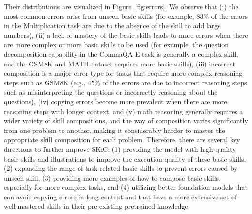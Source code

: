Their distributions are visualized in Figure~\ref{fig:errors}. We observe that (i) the most common errors arise from unseen basic skills (for example, 83\% of the errors in the Multiplication task are due to the absence of the skill to add large numbers), (ii) a lack of mastery of the basic skills leads to more errors when there are more complex or more basic skills to be used (for example, the question decomposition capability in the CommaQA-E task is generally a complex skill, and the GSM8K and MATH dataset requires more basic skills), (iii) incorrect composition is a major error type for tasks that require more complex reasoning steps such as GSM8K (e.g., 45\% of the errors are due to incorrect reasoning steps such as misinterpreting the questions or incorrectly reasoning about the questions), (iv) copying errors become more prevalent when there are more reasoning steps with longer context, and (v) math reasoning generally requires a wider variety of skill compositions, and the way of composition varies significantly from one problem to another, making it considerably harder to master the appropriate skill composition for each problem. Therefore, there are several key directions to further improve SKiC: (1) providing the model with high-quality basic skills and illustrations to improve the execution quality of these basic skills, (2) expanding the range of task-related basic skills to prevent errors caused by unseen skill, (3) providing more examples of how to compose basic skills, especially for more complex tasks, and (4) utilizing better foundation models that can avoid copying errors in long context and that have a more extensive set of well-mastered skills in their pre-existing pretrained knowledge.






